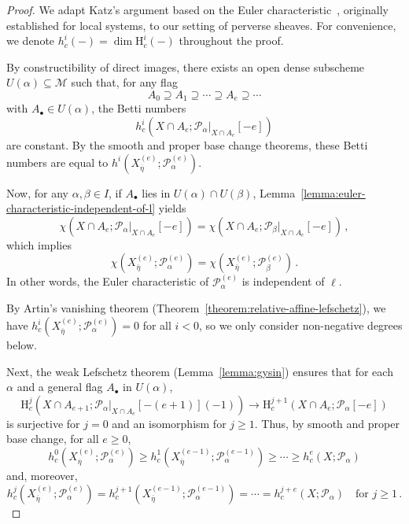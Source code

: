 \documentclass[english]{smfart}
\renewcommand{\geq}{\geqslant}
\renewcommand{\subset}{\subseteq}
\renewcommand{\supset}{\supseteq}
\theoremstyle{remark}
\theoremstyle{plain}
\theoremstyle{definition}
\numberwithin{equation}{remark}
\theoremstyle{void}
\begin{document}
\begin{proof}
We adapt Katz's argument based on the Euler
characteristic~\cite{katz_betti}, originally established for local
systems, to our setting of perverse sheaves.  For convenience, we
denote \(h^i_{c}(-) = \dim \mathrm{H}^{i}_{c}(-)\) throughout the
proof.

By constructibility of direct images, there exists an open dense
subscheme \(U(\alpha) \subset \mathcal{M}\) such that, for any flag
\[
A_0 \supset A_1 \supset \cdots \supset A_e \supset \cdots
\]
with \(A_{\bullet} \in U(\alpha)\), the Betti numbers
\[
h^i_{c}(X \cap A_e; \mathcal{P}_{\alpha}|_{X \cap A_e}[-e])
\]
are constant.  By the smooth and proper base change theorems, these
Betti numbers are equal to
\(h^i(X^{(e)}_{\overline{\eta}}; \mathcal{P}^{(e)}_{\alpha})\).

Now, for any \(\alpha, \beta \in I\), if \(A_{\bullet}\) lies in
\(U(\alpha) \cap U(\beta)\),
Lemma~\ref{lemma:euler-characteristic-independent-of-l} yields
\[
\chi(X \cap A_e; \mathcal{P}_{\alpha}|_{X \cap A_e}[-e]) =
\chi(X \cap A_e; \mathcal{P}_{\beta}|_{X \cap A_e}[-e])\,,
\]
which implies
\begin{equation}
\label{eq:generic-indept-ell-euler}
\chi(X^{(e)}_{\overline{\eta}}; \mathcal{P}^{(e)}_{\alpha}) =
\chi(X^{(e)}_{\overline{\eta}}; \mathcal{P}^{(e)}_{\beta})\,.
\end{equation}
In other words, the Euler characteristic of
\(\mathcal{P}^{(e)}_{\alpha}\) is independent of \(\ell\).

By Artin's vanishing theorem (Theorem~\ref{theorem:relative-affine-lefschetz}),
we have \(h^{i}_{c}(X^{(e)}_{\overline{\eta}}; \mathcal{P}^{(e)}_{\alpha}) = 0\) for all \(i < 0\),
so we only consider non-negative degrees below.

Next, the weak Lefschetz theorem (Lemma~\ref{lemma:gysin})
ensures that for each \(\alpha\) and a general flag \(A_{\bullet}\) in \(U(\alpha)\),
\begin{equation*}
\mathrm{H}^{j}_{c}(X \cap A_{e+1}; \mathcal{P}_{\alpha}|_{X\cap A_{e}}[-(e+1)](-1))
\to \mathrm{H}^{j+1}_{c}(X \cap A_{e};\mathcal{P}_{\alpha}[-e])
\end{equation*}
is surjective for \(j = 0\) and an isomorphism for \(j \geq 1\).
Thus, by smooth and proper base change, for all \(e \geq 0\),
\begin{equation}
\label{eq:chain-ineq}
h^{0}_{c}(X^{(e)}_{\overline{\eta}}; \mathcal{P}^{(e)}_{\alpha}) \geq
h^{1}_{c}(X^{(e-1)}_{\overline{\eta}}; \mathcal{P}^{(e-1)}_{\alpha})
\geq \cdots \geq h^{e}_{c}(X; \mathcal{P}_{\alpha})
\end{equation}
and, moreover,
\begin{equation}
\label{eq:chain-eq}
h^{j}_{c}(X^{(e)}_{\overline{\eta}}; \mathcal{P}^{(e)}_{\alpha}) =
h^{j+1}_{c}(X^{(e-1)}_{\overline{\eta}}; \mathcal{P}_{\alpha}^{(e-1)}) = \cdots =
h^{j+e}_{c}(X;\mathcal{P}_{\alpha}) \quad \text{for } j \geq 1\,.
\end{equation}


\end{proof}
\end{document}

